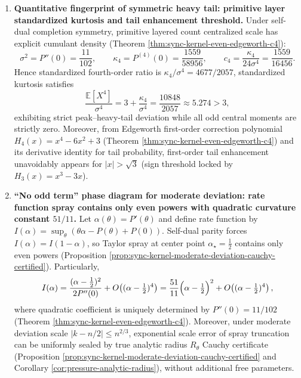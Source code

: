 \begin{enumerate}
  \item \textbf{Quantitative fingerprint of symmetric heavy tail: primitive layer standardized kurtosis and tail enhancement threshold.}
  Under self-dual completion symmetry, primitive layered count centralized scale has explicit cumulant density (Theorem \ref{thm:sync-kernel-even-edgeworth-c4}):
  \[
  \sigma^2=P''(0)=\frac{11}{102},\qquad
  \kappa_4=P^{(4)}(0)=\frac{1559}{58956},
  \qquad
  c_4=\frac{\kappa_4}{24\sigma^4}=\frac{1559}{16456}.
  \]
  Hence standardized fourth-order ratio is \(\kappa_4/\sigma^4=4677/2057\), standardized kurtosis satisfies
  \[
  \frac{\mathbb{E}[X^4]}{\sigma^4}=3+\frac{\kappa_4}{\sigma^4}=\frac{10848}{2057}\approx 5.274>3,
  \]
  exhibiting strict peak--heavy-tail deviation while all odd central moments are strictly zero.
  Moreover, from Edgeworth first-order correction polynomial \(H_4(x)=x^4-6x^2+3\) (Theorem \ref{thm:sync-kernel-even-edgeworth-c4}) and its derivative identity for tail probability, first-order tail enhancement unavoidably appears for \(|x|>\sqrt3\) (sign threshold locked by \(H_3(x)=x^3-3x\)).

  \item \textbf{``No odd term'' phase diagram for moderate deviation: rate function spray contains only even powers with quadratic curvature constant \texorpdfstring{$51/11$}{51/11}.}
  Let \(\alpha(\theta)=P'(\theta)\) and define rate function by \(I(\alpha)=\sup_\theta(\theta\alpha-P(\theta)+P(0))\).
  Self-dual parity forces \(I(\alpha)=I(1-\alpha)\), so Taylor spray at center point \(\alpha_\star=\tfrac12\) contains only even powers (Proposition \ref{prop:sync-kernel-moderate-deviation-cauchy-certified}).
  Particularly,
  \[
  I(\alpha)=\frac{(\alpha-\tfrac12)^2}{2P''(0)}+O\!\left((\alpha-\tfrac12)^4\right)
  =\frac{51}{11}\Bigl(\alpha-\tfrac12\Bigr)^2+O\!\left((\alpha-\tfrac12)^4\right),
  \]
  where quadratic coefficient is uniquely determined by \(P''(0)=11/102\) (Theorem \ref{thm:sync-kernel-even-edgeworth-c4}).
  Moreover, under moderate deviation scale \(|k-n/2|\le n^{2/3}\), exponential scale error of spray truncation can be uniformly sealed by true analytic radius \(R_\theta\) Cauchy certificate (Proposition \ref{prop:sync-kernel-moderate-deviation-cauchy-certified} and Corollary \ref{cor:pressure-analytic-radius}), without additional free parameters.


\end{enumerate}
